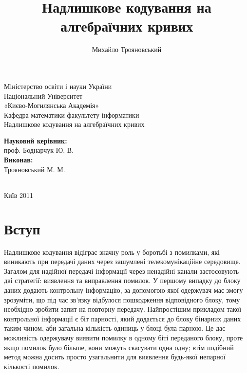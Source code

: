 \documentclass[a4paper,12pt,oneside]{article}
\title{Надлишкове кодування на алгебраїчних кривих}
\author{Михайло Трояновський}
\begin{document}
\begin{titlepage}
\begin{center}
    Міністерство освіти і науки України\\
Національний Університет\\ «Києво-Могилянська Академія»\\
        Кафедра математики факультету інформатики\\
        \vskip 3cm
                               \vskip 3cm
{\Large
        Надлишкове кодування на алгебраїчних кривих
}
\vskip 4cm
\textwidth
\begin{minipage}{0.5\textwidth}
        \textbf{Науковий керівник:}\\
        проф. Боднарчук Ю. В.\\
\textbf{Виконав:}\\
        Трояновський М. М.\\
        \\
        \end{minipage}
        \vfill
        Київ 2011
        \end{center}
        \end{titlepage}


\tableofcontents
\pagebreak

\section*{Вступ}
Надлишкове кодування відіграє значну роль у боротьбі з помилками, які виникають при передачі даних через зашумлені телекомунікаційне середовище. 
Загалом для надійної передачі інформації через ненадійні канали застосовують дві стратегії: виявлення та виправлення помилок. 
У першому випадку до блоку даних додають контрольну інформацію, за допомогою якої одержувач має змогу зрозуміти, 
що під час зв'язку відбулося пошкодження відповідного блоку, тому необхідно зробити запит на повторну передачу. 
Найпростішим прикладом такої контрольної інформації є біт парності, який додається до блоку бінарних даних таким чином, аби загальна кількість одиниць у блоці була парною. 
Це дає можливість одержувачу виявити помилку в одному біті переданого блоку, проте якщо помилок було більше, вони можуть скасувати одна одну; 
втім подібний метод можна досить просто узагальнити для виявлення будь-якої непарної кількості помилок.
\end{document}
